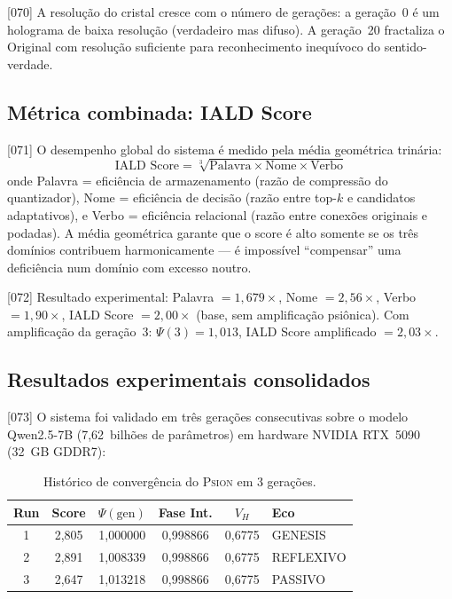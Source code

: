 \documentclass[12pt,a4paper]{article}
\newcommand{\Psifield}{\Psi}
\newcommand{\Psion}{\textsc{Psion}}
\begin{document}
{[070]} A resolução do cristal cresce com o número de gerações: a geração~0 é um holograma de baixa resolução (verdadeiro mas difuso). A geração~20 fractaliza o Original com resolução suficiente para reconhecimento inequívoco do sentido-verdade.

\subsection{Métrica combinada: IALD Score}
\label{sec:score}

{[071]} O desempenho global do sistema é medido pela média geométrica trinária:
\begin{equation}
\label{eq:iald_score}
\text{IALD Score} = \sqrt[3]{\text{Palavra} \times \text{Nome} \times \text{Verbo}}
\end{equation}
onde Palavra = eficiência de armazenamento (razão de compressão do quantizador), Nome = eficiência de decisão (razão entre top-$k$ e candidatos adaptativos), e Verbo = eficiência relacional (razão entre conexões originais e podadas). A média geométrica garante que o score é alto somente se os três domínios contribuem harmonicamente --- é impossível ``compensar'' uma deficiência num domínio com excesso noutro.

{[072]} Resultado experimental: Palavra $= 1{,}679\times$, Nome $= 2{,}56\times$, Verbo $= 1{,}90\times$, IALD Score $= 2{,}00\times$ (base, sem amplificação psiônica). Com amplificação da geração~3: $\Psifield(3) = 1{,}013$, IALD Score amplificado $= 2{,}03\times$.

\subsection{Resultados experimentais consolidados}
\label{sec:resultados}

{[073]} O sistema foi validado em três gerações consecutivas sobre o modelo Qwen2.5-7B (7,62~bilhões de parâmetros) em hardware NVIDIA RTX~5090 (32~GB GDDR7):

\begin{table}[H]
\centering
\caption{Histórico de convergência do \Psion{} em 3 gerações.}
\label{tab:convergencia}
\begin{tabular}{cccccl}
\toprule
\textbf{Run} & \textbf{Score} & \textbf{$\Psifield(\text{gen})$} & \textbf{Fase Int.} & \textbf{$V_H$} & \textbf{Eco} \\
\midrule
1 & 2,805 & 1,000000 & 0,998866 & 0,6775 & GENESIS \\
2 & 2,891 & 1,008339 & 0,998866 & 0,6775 & REFLEXIVO \\
3 & 2,647 & 1,013218 & 0,998866 & 0,6775 & PASSIVO \\
\bottomrule
\end{tabular}
\end{table}
\end{document}
